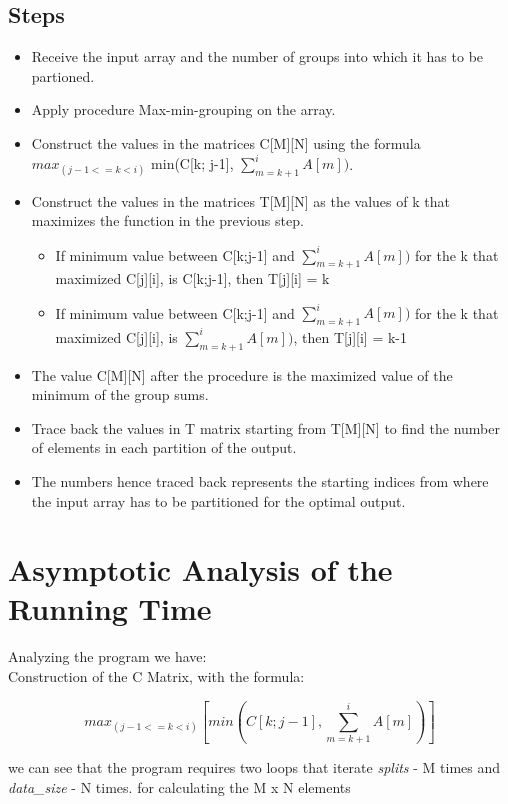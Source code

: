 \documentclass{article}
\begin{document}
\begin{spacing}{0.005}
\subsection{Steps}
\begin{itemize}
\item Receive the input array  and the number of groups into which it has to be partioned.
\item Apply procedure Max-min-grouping on the array.
\item Construct the values in the matrices C[M][N]  using the formula $max_{(j-1 <= k < i)}$ {min(C[k; j-1], $\sum_{m = k+1}^{i} A[m])$}.
\item Construct the values in the matrices T[M][N]  as the values of k that maximizes the function in the previous step.
  \begin{itemize}
  \item If minimum value between C[k;j-1] and $\sum_{m = k+1}^{i} A[m])$ for the k that maximized C[j][i], is C[k;j-1], then T[j][i] = k
  \item If minimum value between C[k;j-1] and $\sum_{m = k+1}^{i} A[m])$ for the k that maximized C[j][i], is $\sum_{m = k+1}^{i} A[m])$, then T[j][i] = k-1
  \end{itemize}
\item The value C[M][N] after the procedure is the maximized value of the minimum of the group sums.
\item Trace back the values in T matrix starting from T[M][N] to find the number of elements in each partition of the output.
\item The numbers hence traced back represents the starting indices from where the input array has to be partitioned for the optimal output.
\end{itemize}

\end{spacing}


\section{Asymptotic Analysis of the Running Time}
Analyzing the program we have:\\
Construction of the C Matrix, with the formula:

\[
max_{(j-1 <= k < i)} [ min(C[k; j-1], \sum_{m = k+1}^{i} A[m]) ]
\]

we can see that the program requires two loops that iterate \textit{splits} - M times and \textit{data\_size} - N times.
for calculating the M x N elements
\end{document}

